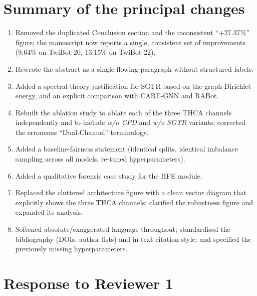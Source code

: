 \documentclass[11pt]{article}
\begin{document}
\section*{Summary of the principal changes}
\begin{enumerate}[leftmargin=*,itemsep=1pt]
  \item Removed the duplicated Conclusion section and the inconsistent ``+27.37\%''
        figure; the manuscript now reports a single, consistent set of improvements
        (9.64\% on TwiBot-20, 13.15\% on TwiBot-22).
  \item Rewrote the abstract as a single flowing paragraph without structured labels.
  \item Added a spectral-theory justification for SGTR based on the graph Dirichlet
        energy, and an explicit comparison with CARE-GNN and RABot.
  \item Rebuilt the ablation study to ablate each of the three THCA channels
        independently and to include \emph{w/o CPD} and \emph{w/o SGTR} variants;
        corrected the erroneous ``Dual-Channel'' terminology.
  \item Added a baseline-fairness statement (identical splits, identical imbalance
        sampling across all models, re-tuned hyperparameters).
  \item Added a qualitative forensic case study for the HFE module.
  \item Replaced the cluttered architecture figure with a clean vector diagram that
        explicitly shows the three THCA channels; clarified the robustness figure and
        expanded its analysis.
  \item Softened absolute/exaggerated language throughout; standardised the
        bibliography (DOIs, author lists) and in-text citation style; and specified
        the previously missing hyperparameters.
\end{enumerate}

\section*{Response to Reviewer 1}
\end{document}
